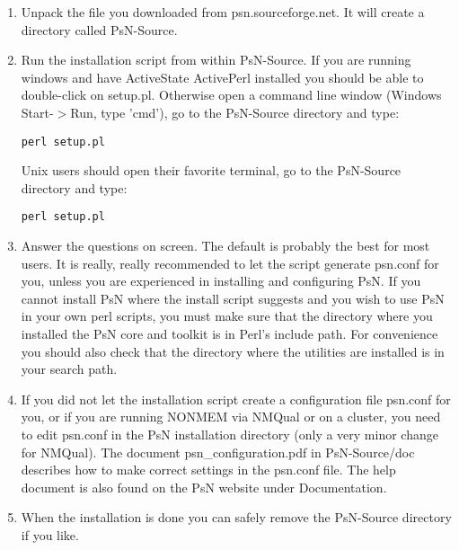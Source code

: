 \begin{enumerate}
\item Unpack the file you downloaded from psn.sourceforge.net. It will create a directory called PsN-Source.
\item Run the installation script from within PsN-Source. If you are running windows and have ActiveState ActivePerl installed you should be able to double-click on setup.pl. Otherwise open a command line window (Windows Start-$>$Run, type 'cmd'), go to the PsN-Source directory and type: 
\begin{verbatim}
perl setup.pl
\end{verbatim}
Unix users should open their favorite terminal, go to the PsN-Source directory and type:
\begin{verbatim}
perl setup.pl
\end{verbatim}
\item Answer the questions on screen. The default is probably the best for most users. It is really, really recommended to let the script generate psn.conf for you, unless you are experienced in installing and configuring PsN.
If you cannot install PsN where the install script suggests and you wish to use PsN in your own perl scripts, you must make sure that the directory where you installed the PsN core and toolkit is in Perl's include path. For convenience you should also check that the directory where the utilities are installed is in your search path. 
\item If you did not let the installation script create a configuration file psn.conf for you, or if you are running NONMEM via NMQual or on a cluster, you need to edit psn.conf in the PsN installation directory (only a very minor change for NMQual). The document psn\_configuration.pdf in PsN-Source/doc describes how to make correct settings in the psn.conf file. The help document is also found on the PsN website under Documentation.
\item When the installation is done you can safely remove the PsN-Source directory if you like. 
\end{enumerate}


